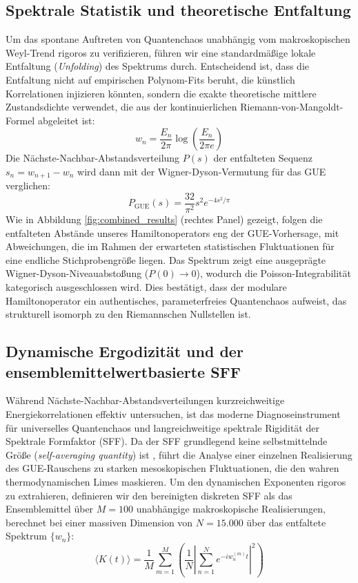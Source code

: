 \documentclass[aps,prl,preprint,superscriptaddress,floatfix]{revtex4-2}
\begin{document}
\subsection{Spektrale Statistik und theoretische Entfaltung}
Um das spontane Auftreten von Quantenchaos unabhängig vom makroskopischen Weyl-Trend rigoros zu verifizieren, führen wir eine standardmäßige lokale Entfaltung (\textit{Unfolding}) des Spektrums durch. Entscheidend ist, dass die Entfaltung nicht auf empirischen Polynom-Fits beruht, die künstlich Korrelationen injizieren könnten, sondern die exakte theoretische mittlere Zustandsdichte verwendet, die aus der kontinuierlichen Riemann-von-Mangoldt-Formel abgeleitet ist:
\begin{equation}
w_n = \frac{E_n}{2\pi} \log\left(\frac{E_n}{2\pi e}\right)
\end{equation}
Die Nächste-Nachbar-Abstandsverteilung $P(s)$ der entfalteten Sequenz $s_n = w_{n+1} - w_n$ wird dann mit der Wigner-Dyson-Vermutung für das GUE verglichen:
\begin{equation}
P_{\text{GUE}}(s) = \frac{32}{\pi^2} s^2 e^{-4s^2/\pi}
\end{equation}
Wie in Abbildung \ref{fig:combined_results} (rechtes Panel) gezeigt, folgen die entfalteten Abstände unseres Hamiltonoperators eng der GUE-Vorhersage, mit Abweichungen, die im Rahmen der erwarteten statistischen Fluktuationen für eine endliche Stichprobengröße liegen. Das Spektrum zeigt eine ausgeprägte Wigner-Dyson-Niveauabstoßung ($P(0) \to 0$), wodurch die Poisson-Integrabilität kategorisch ausgeschlossen wird. Dies bestätigt, dass der modulare Hamiltonoperator ein authentisches, parameterfreies Quantenchaos aufweist, das strukturell isomorph zu den Riemannschen Nullstellen ist.

\subsection{Dynamische Ergodizität und der ensemblemittelwertbasierte SFF}

Während Nächste-Nachbar-Abstandsverteilungen kurzreichweitige Energiekorrelationen effektiv untersuchen, ist das moderne Diagnoseinstrument für universelles Quantenchaos und langreichweitige spektrale Rigidität der Spektrale Formfaktor (SFF). Da der SFF grundlegend keine selbstmittelnde Größe (\textit{self-averaging quantity}) ist \cite{Cotler2017, Saad2019}, führt die Analyse einer einzelnen Realisierung des GUE-Rauschens zu starken mesoskopischen Fluktuationen, die den wahren thermodynamischen Limes maskieren. Um den dynamischen Exponenten rigoros zu extrahieren, definieren wir den bereinigten diskreten SFF als das Ensemblemittel über $M=100$ unabhängige makroskopische Realisierungen, berechnet bei einer massiven Dimension von $N=15.000$ über das entfaltete Spektrum $\{w_n\}$:
\begin{equation}
\langle K(t) \rangle = \frac{1}{M} \sum_{m=1}^{M} \left( \frac{1}{N} \left| \sum_{n=1}^N e^{-i w_n^{(m)} t} \right|^2 \right)
\end{equation}
\end{document}
